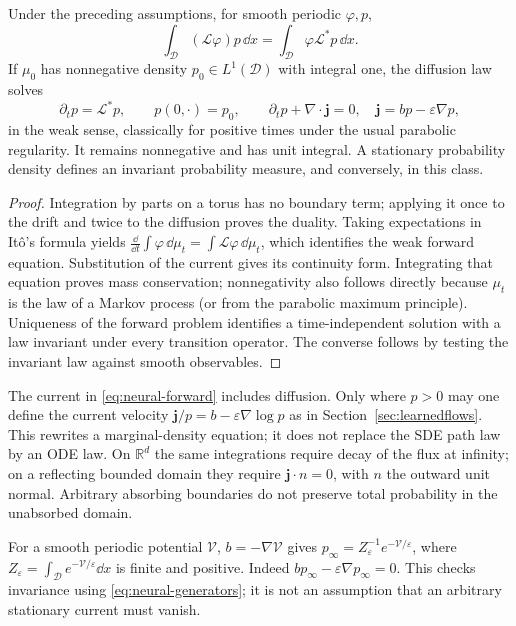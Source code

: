 \documentclass[12pt,a4paper,oneside]{book}
\begin{document}
\begin{proposition}
\label{prop:neural-fp}
Under the preceding assumptions, for smooth periodic $\varphi,p$,
\begin{equation*}
 \int_{\mathcal D}(\mathcal L\varphi)p\,\dd x
 =\int_{\mathcal D}\varphi\mathcal L^*p\,\dd x.
\end{equation*}
If $\mu_0$ has nonnegative density $p_0\in L^1(\mathcal D)$ with integral one, the diffusion law solves
\begin{equation}
 \partial_t p=\mathcal L^*p,
 \qquad p(0,\cdot)=p_0,
 \qquad \partial_t p+\nabla\cdot\boldsymbol j=0,
 \quad \boldsymbol j=bp-\varepsilon\nabla p,
 \label{eq:neural-forward}
\end{equation}
in the weak sense, classically for positive times under the usual parabolic regularity. It remains nonnegative and has
unit integral. A stationary probability density defines an invariant probability measure, and conversely, in this class.
\end{proposition}
\begin{proof}
Integration by parts on a torus has no boundary term; applying it once to the drift and twice to the diffusion proves
the duality. Taking expectations in It\^o's formula yields
$\frac{\dd}{\dd t}\int\varphi\,\dd\mu_t=\int\mathcal L\varphi\,\dd\mu_t$, which identifies the weak forward equation.
Substitution of the current gives its continuity form. Integrating that equation proves mass conservation; nonnegativity
also follows directly because $\mu_t$ is the law of a Markov process (or from the parabolic maximum principle).
Uniqueness of the forward problem identifies a time-independent solution with a law invariant under every transition
operator. The converse follows by testing the invariant law against smooth observables.
\end{proof}

The current in \eqref{eq:neural-forward} includes diffusion. Only where $p>0$ may one define the current velocity
$\boldsymbol j/p=b-\varepsilon\nabla\log p$ as in Section~\ref{sec:learnedflows}. This rewrites a marginal-density
equation; it does not replace the SDE path law by an ODE law. On $\mathbb R^d$ the same integrations require decay of
the flux at infinity; on a reflecting bounded domain they require $\boldsymbol j\cdot n=0$, with $n$ the outward unit
normal. Arbitrary absorbing boundaries do not preserve total probability in the unabsorbed domain.

For a smooth periodic potential $\mathcal V$, $b=-\nabla\mathcal V$ gives
$p_\infty=Z_\varepsilon^{-1}e^{-\mathcal V/\varepsilon}$, where
$Z_\varepsilon=\int_{\mathcal D}e^{-\mathcal V/\varepsilon}\dd x$ is finite and positive.
Indeed $bp_\infty-\varepsilon\nabla p_\infty=0$. This checks invariance using
\eqref{eq:neural-generators}; it is not an assumption that an arbitrary stationary current must vanish.
\end{document}
